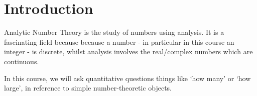 \documentclass{article}
\newcommand{\1}{\mathbbm{1}}
\begin{document}
\maketitle

\tableofcontents

\clearpage
\section{Introduction}
\newlec
Analytic Number Theory is the study of numbers using analysis. It is a fascinating field because because a number - in particular in this course an integer - is discrete, whilst analysis involves the real/complex numbers which are continuous.

In this course, we will ask quantitative questions things like `how many' or `how large', in reference to simple number-theoretic objects.
\end{document}
